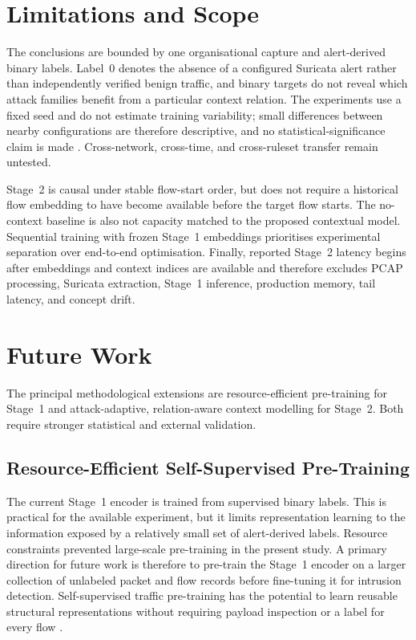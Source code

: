 \documentclass[11pt,fleqn]{report}
\begin{document}
\section{Limitations and Scope}
\label{subsec:conclusion_limitations}

The conclusions are bounded by one organisational capture and alert-derived binary labels. Label~0 denotes the absence of a configured Suricata alert rather than independently verified benign traffic, and binary targets do not reveal which attack families benefit from a particular context relation. The experiments use a fixed seed and do not estimate training variability; small differences between nearby configurations are therefore descriptive, and no statistical-significance claim is made \cite{ReimersGurevych2017,Bouthillier2021Variance}. Cross-network, cross-time, and cross-ruleset transfer remain untested.

Stage~2 is causal under stable flow-start order, but does not require a historical flow embedding to have become available before the target flow starts. The no-context baseline is also not capacity matched to the proposed contextual model. Sequential training with frozen Stage~1 embeddings prioritises experimental separation over end-to-end optimisation. Finally, reported Stage~2 latency begins after embeddings and context indices are available and therefore excludes PCAP processing, Suricata extraction, Stage~1 inference, production memory, tail latency, and concept drift.

\section{Future Work}
\label{subsec:conclusion_future_work}

The principal methodological extensions are resource-efficient pre-training for Stage~1 and attack-adaptive, relation-aware context modelling for Stage~2. Both require stronger statistical and external validation.

\subsection{Resource-Efficient Self-Supervised Pre-Training}
\label{subsubsec:future_pretraining}

The current Stage~1 encoder is trained from supervised binary labels. This is practical for the available experiment, but it limits representation learning to the information exposed by a relatively small set of alert-derived labels. Resource constraints prevented large-scale pre-training in the present study. A primary direction for future work is therefore to pre-train the Stage~1 encoder on a larger collection of unlabeled packet and flow records before fine-tuning it for intrusion detection. Self-supervised traffic pre-training has the potential to learn reusable structural representations without requiring payload inspection or a label for every flow
\cite{2024MAETraffic,Dong2025EncryptedPretrain}.
\end{document}
